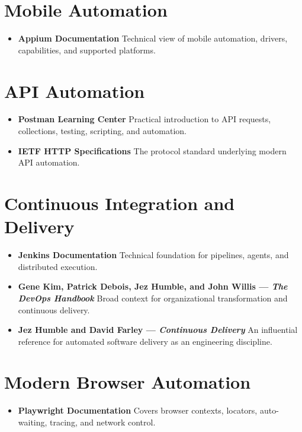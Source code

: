 \documentclass[11pt,twoside]{book}
\begin{document}
\section*{Mobile Automation}
\begin{itemize}[nosep]
    \item \textbf{Appium Documentation} Technical view of mobile automation, drivers, capabilities, and supported platforms.
\end{itemize}

\section*{API Automation}
\begin{itemize}[nosep]
    \item \textbf{Postman Learning Center} Practical introduction to API requests, collections, testing, scripting, and automation.
    \item \textbf{IETF HTTP Specifications} The protocol standard underlying modern API automation.
\end{itemize}

\section*{Continuous Integration and Delivery}
\begin{itemize}[nosep]
    \item \textbf{Jenkins Documentation} Technical foundation for pipelines, agents, and distributed execution.
    \item \textbf{Gene Kim, Patrick Debois, Jez Humble, and John Willis — \textit{The DevOps Handbook}} Broad context for organizational transformation and continuous delivery.
    \item \textbf{Jez Humble and David Farley — \textit{Continuous Delivery}} An influential reference for automated software delivery as an engineering discipline.
\end{itemize}

\section*{Modern Browser Automation}
\begin{itemize}[nosep]
    \item \textbf{Playwright Documentation} Covers browser contexts, locators, auto-waiting, tracing, and network control.
\end{itemize}
\end{document}
